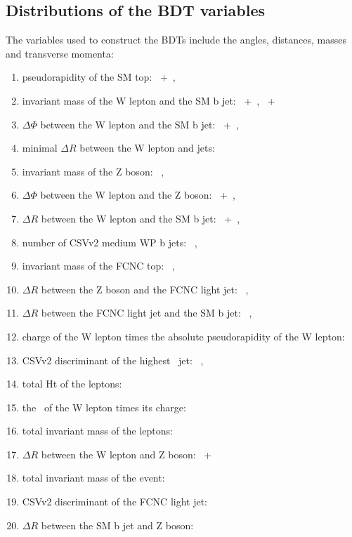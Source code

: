 \subsection{Distributions of the BDT variables}
\label{sec:BDTvars}
The variables used to construct the BDTs include the angles, distances, masses and transverse momenta:
\begin{enumerate}
	\item pseudorapidity of the SM top: \TTSR\ +\STSR\ \Zut  , \STSR\ \Zct 
	\item invariant mass of the W lepton and the SM b jet: \TTSR\ +\STSR\ \Zut , \TTSR\ +\STSR\ \Zct\ 
	\item $\Delta \Phi$ between the W lepton and the SM b jet: \TTSR\ +\STSR\ \Zut , \STSR\ \Zct\ 
	\item minimal $\Delta R$ between the W lepton and jets: \TTSR\ \Zut 
	\item invariant mass of the Z boson: \TTSR\ \Zut , \TTSR\ \Zct\ 
	\item $\Delta \Phi$ between the W lepton and the Z boson: \TTSR\ +\STSR\ \Zut , \TTSR\ \Zct\ 
	\item $\Delta R$ between the W lepton and the SM b jet: \TTSR\ +\STSR\ \Zut , \TTSR\ \Zct\ 
	\item  number of CSVv2 medium WP b jets: \TTSR\ \Zut , \TTSR\ \Zct\ 
	\item invariant mass of the FCNC top: \TTSR\ \Zut , \TTSR\ \Zct\ 
	\item $\Delta R$ between the Z boson and the FCNC light jet: \TTSR\ \Zut , \TTSR\ \Zct\ 
	\item $\Delta R$ between the FCNC light jet and the SM b jet: \TTSR\ \Zut , \TTSR\ \Zct\ 
	\item charge of the W lepton times the absolute pseudorapidity of the W lepton: \STSR\ \Zut 
	\item CSVv2 discriminant of the highest \pt\ jet: \STSR\ \Zut , \STSR\ \Zct\ 
	\item total Ht of the leptons: \STSR\ \Zut 
	\item the \pt\ of the W lepton times its charge: \STSR\ \Zut 
	\item total invariant mass of the leptons: \STSR\ \Zct\ 
	\item $\Delta R$ between the W lepton and Z boson: \TTSR\ +\STSR\ \Zct\ 
	\item total invariant mass of the event: \TTSR\ \Zct\ 
	\item CSVv2 discriminant of the FCNC light jet: \TTSR\ \Zct\ 
	\item $\Delta R$ between the SM b jet and Z boson: \TTSR\ \Zct\ 
\end{enumerate}

